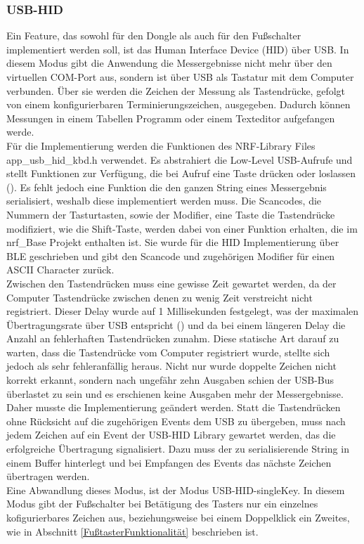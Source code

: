 \subsubsection{USB-HID}
Ein Feature, das sowohl für den Dongle als auch für den Fußschalter implementiert werden soll, ist das Human Interface Device (HID) über USB. In diesem Modus gibt die Anwendung die Messergebnisse nicht mehr über den virtuellen COM-Port aus, sondern ist über USB als Tastatur mit dem Computer verbunden. Über sie werden die Zeichen der Messung als Tastendrücke, gefolgt von einem konfigurierbaren Terminierungszeichen, ausgegeben. Dadurch können Messungen in einem Tabellen Programm oder einem Texteditor aufgefangen werde.\\
Für die Implementierung werden die Funktionen des NRF-Library Files app\_usb\_hid\_kbd.h verwendet. Es abstrahiert die Low-Level USB-Aufrufe und stellt Funktionen zur Verfügung, die bei Aufruf eine Taste drücken oder loslassen (\cite{NRF_USB_HID_keyboard}). Es fehlt jedoch eine Funktion die  den ganzen String eines Messergebnis serialisiert, weshalb diese implementiert werden muss. Die Scancodes, die Nummern der Tasturtasten, sowie der Modifier, eine Taste die Tastendrücke modifiziert, wie die Shift-Taste, werden dabei von einer Funktion erhalten, die im nrf\_Base Projekt enthalten ist. Sie wurde für die \ac{HID} Implementierung über \ac{BLE} geschrieben und gibt den Scancode und zugehörigen Modifier für einen \ac{ASCII} Character zurück.\\
Zwischen den Tastendrücken muss eine gewisse Zeit gewartet werden, da der Computer Tastendrücke zwischen denen zu wenig Zeit verstreicht nicht registriert. Dieser Delay wurde auf 1 Millisekunden festgelegt, was der maximalen Übertragungsrate über \ac{USB} entspricht (\cite[17]{HID_USB_Specification}) und da bei einem längeren Delay die Anzahl an fehlerhaften Tastendrücken zunahm. Diese statische Art darauf zu warten, dass die Tastendrücke vom Computer registriert wurde, stellte sich jedoch als sehr fehleranfällig heraus. Nicht nur wurde doppelte Zeichen nicht korrekt erkannt, sondern nach ungefähr zehn Ausgaben schien der \ac{USB}-Bus überlastet zu sein und es erschienen keine Ausgaben mehr der Messergebnisse. Daher musste die Implementierung geändert werden. Statt die Tastendrücken ohne Rücksicht auf die zugehörigen Events dem \ac{USB} zu übergeben, muss nach jedem Zeichen auf ein Event der \ac{USB}-\ac{HID} Library gewartet werden, das die erfolgreiche Übertragung signalisiert. Dazu muss der zu serialisierende String in einem Buffer hinterlegt und bei Empfangen des Events das nächste Zeichen übertragen werden.\\
Eine Abwandlung dieses Modus, ist der Modus \ac{USB}-\ac{HID}-singleKey. In diesem Modus gibt der Fußschalter bei Betätigung des Tasters nur ein einzelnes kofigurierbares Zeichen aus, beziehungsweise bei einem Doppelklick ein Zweites, wie in Abschnitt \ref{FußtasterFunktionalität} beschrieben ist.

